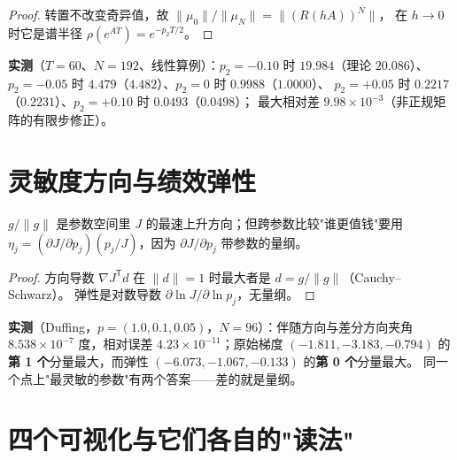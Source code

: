 \begin{proof}
转置不改变奇异值，故 $\|\mu_0\|/\|\mu_N\|=\|(R(hA))^N\|$，
在 $h\to0$ 时它是谱半径 $\rho(e^{AT})=e^{-p_2T/2}$。
\end{proof}

\textbf{实测}（$T=60$、$N=192$、线性算例）：$p_2=-0.10$ 时 $19.984$（理论 $20.086$）、
$p_2=-0.05$ 时 $4.479$（$4.482$）、$p_2=0$ 时 $0.9988$（$1.0000$）、
$p_2=+0.05$ 时 $0.2217$（$0.2231$）、$p_2=+0.10$ 时 $0.0493$（$0.0498$）；
最大相对差 $9.98\times10^{-3}$（非正规矩阵的有限步修正）。

\section{灵敏度方向与绩效弹性}

\begin{theorem}[最速上升方向与弹性]\label{thm:elasticity}
$g/\|g\|$ 是参数空间里 $J$ 的最速上升方向；但跨参数比较"谁更值钱"要用
$\eta_j=(\partial J/\partial p_j)(p_j/J)$，因为 $\partial J/\partial p_j$ 带参数的量纲。
\end{theorem}

\begin{proof}
方向导数 $\nabla J^{\mathsf T}d$ 在 $\|d\|=1$ 时最大者是 $d=g/\|g\|$（Cauchy--Schwarz）。
弹性是对数导数 $\partial\ln J/\partial\ln p_j$，无量纲。
\end{proof}

\textbf{实测}（Duffing，$p=(1.0,0.1,0.05)$，$N=96$）：伴随方向与差分方向夹角
$8.538\times10^{-7}$ 度，相对误差 $4.23\times10^{-11}$；原始梯度
$(-1.811,-3.183,-0.794)$ 的\textbf{第 1 个}分量最大，而弹性
$(-6.073,-1.067,-0.133)$ 的\textbf{第 0 个}分量最大。
同一个点上"最灵敏的参数"有两个答案——差的就是量纲。

\section{四个可视化与它们各自的"读法"}

